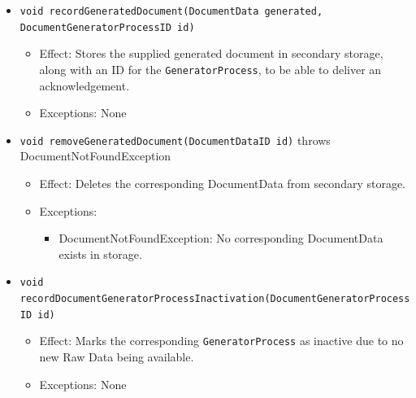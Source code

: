 \documentclass[a4paper,10pt]{article}
\begin{document}
\begin{itemize}
\begin{itemize}
		\item \texttt{void recordGeneratedDocument(DocumentData generated, DocumentGeneratorProcessID id)}
		\begin{itemize}
			\item Effect: Stores the supplied generated document in secondary storage, along with an ID for the \texttt{GeneratorProcess}, to be able to deliver an acknowledgement.
			\item Exceptions: None
		\end{itemize}

		\item \texttt{void removeGeneratedDocument(DocumentDataID id)} throws DocumentNotFoundException
		\begin{itemize}
			\item Effect: Deletes the corresponding DocumentData from secondary storage.
			\item Exceptions:
			\begin{itemize}
				\item DocumentNotFoundException: No corresponding DocumentData exists in storage.
			\end{itemize}
		\end{itemize}

		\item \texttt{void recordDocumentGeneratorProcessInactivation(DocumentGeneratorProcessID id)}
		\begin{itemize}
			\item Effect: Marks the corresponding \texttt{GeneratorProcess} as inactive due to no new Raw Data being available.
			\item Exceptions: None
		\end{itemize}
	\end{itemize}
\end{itemize}
\end{document}
